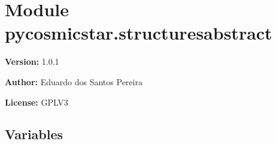%
%
%


\section{Module pycosmicstar.structuresabstract}

    \label{pycosmicstar:structuresabstract}
\textbf{Version:} 1.0.1



\textbf{Author:} Eduardo dos Santos Pereira



\textbf{License:} GPLV3





  \subsection{Variables}

